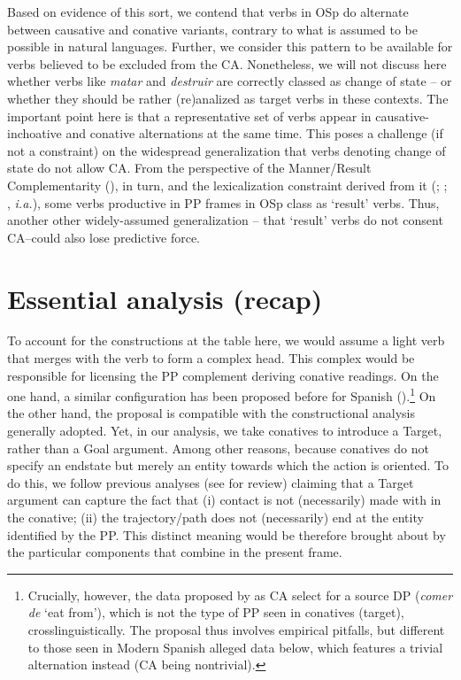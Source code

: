 \documentclass[output=paper,colorlinks,citecolor=brown,
]{langscibook}
\begin{document}
Based on evidence of this sort, we contend that verbs in OSp do alternate between causative and conative variants, contrary to what is assumed to be possible in natural languages. Further, we consider this pattern to be available for verbs believed to be excluded from the CA. Nonetheless, we will not discuss here whether verbs like \textit{matar} and \textit{destruir} are correctly classed as change of state -- or whether they should be rather (re)analized as target verbs in these contexts. The important point here is that a representative set of verbs appear in causative-inchoative and conative alternations at the same time. This poses a challenge (if not a constraint) on the widespread generalization that verbs denoting change of state do not allow CA. From the perspective of the Manner/Result Complementarity (\citealt{RappaportHovavAndLevin2010}), in turn, and the lexicalization constraint derived from it (\citealt{RappaportHovavAndLevin1998}; \citealt{RappaportHovav2008,RappaportHovav2014}; \citealt{Levin1999, Levin2017}, \textit{i.a.}), some verbs productive in PP frames in OSp class as ‘result’ verbs. Thus, another other widely-assumed generalization -- that ‘result’ verbs do not consent CA--could also lose predictive force.

\section{Essential analysis (recap)}\label{sec:mangialavori:4}
To account for the constructions at the table here, we would assume a light verb that merges with the verb to form a complex head. This complex would be responsible for licensing the PP complement deriving conative readings. On the one hand, a similar configuration has been proposed before for Spanish (\citealt{Basilico2010}).\footnote{ Crucially, however, the data proposed by \citet{Basilico2010} as CA select for a source DP (\textit{comer de} ‘eat from’), which is not the type of PP seen in conatives (target), crosslinguistically. The proposal thus involves empirical pitfalls, but different to those seen in Modern Spanish alleged data below, which features a trivial alternation instead (CA being nontrivial).} On the other hand, the proposal is compatible with the constructional analysis generally adopted. Yet, in our analysis, we take conatives to introduce a Target, rather than a Goal argument. Among other reasons, because conatives do not specify an endstate but merely an entity towards which the action is oriented. To do this, we follow previous analyses (see \citealt{Adams2001} for review) claiming that a Target argument can capture the fact that (i) contact is not (necessarily) made with in the conative; (ii) the trajectory/path does not (necessarily) end at the entity identified by the PP. This distinct meaning would be therefore brought about by the particular components that combine in the present frame.
\end{document}
